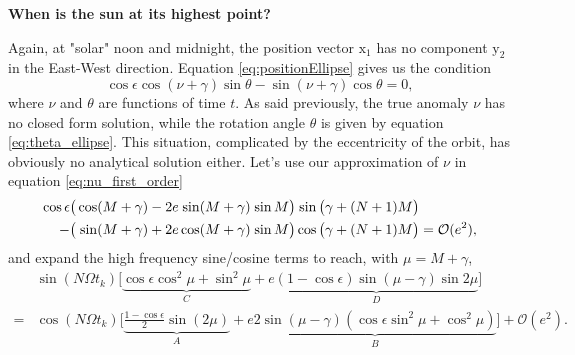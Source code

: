 \documentclass[12pt]{article}
\newcommand{\Sin}{%
  \mathop{\sbox0{$\cos$}\makebox[\wd0][r]{$\sin$}}%
}
\begin{document}
\pagebreak
\textbf{When is the sun at its highest point?}

Again, at "solar" noon and midnight, the position vector $\mathrm{x}_1$ has no 
component $\mathrm{y}_2$ in the East-West direction. 
Equation \eqref{eq:positionEllipse} gives us the condition
\begin{equation}
    \cos\epsilon \cos(\nu+\gamma) \sin\theta - \sin(\nu+\gamma) \cos\theta = 0,
\end{equation}
where $\nu$ and $\theta$ are functions of time $t$. As said previously, the
true anomaly $\nu$ has no closed form solution, while the rotation angle
$\theta$ is given by equation \eqref{eq:theta_ellipse}. This situation, 
complicated by the eccentricity of the orbit, has obviously no analytical 
solution either.
Let's use our approximation of $\nu$ in equation \eqref{eq:nu_first_order}
\begin{equation}
    \begin{aligned}
        \cos \epsilon &\big(
            \cos (M+\gamma) - 2e \Sin(M+\gamma) \Sin M
        \big) \Sin\big(
            \gamma + (N+1)M
        \big)\\
        -&\big(
            \Sin (M+\gamma) + 2e\cos(M+\gamma)\Sin M
        \big) \cos\big(
            \gamma + (N+1)M
        \big) = \mathcal{O}(e^2),
    \end{aligned}
\end{equation}
and expand the high frequency sine/cosine terms to reach, with $\mu=M+\gamma$,
\begin{equation}
    \begin{aligned}
        &\sin(N\Omega t_k) \Big[
            \underbrace{\cos\epsilon \cos^2\mu + \sin^2\mu}_{C} 
            + e \underbrace{
                (1-\cos\epsilon) \sin (\mu-\gamma)\sin 2\mu
            }_D
        \Big] \\
        = &\cos(N\Omega t_k) \Big[
            \underbrace{\tfrac{1-\cos\epsilon}{2} \sin(2\mu)}_A 
            + e \underbrace{
                2\sin(\mu-\gamma) (\cos \epsilon \sin^2 \mu + \cos^2 \mu)
            }_B\Big]
        +\mathcal{O}(e^2).
    \end{aligned}
    \label{eq:noon_time_ellipse}
\end{equation}
\end{document}
